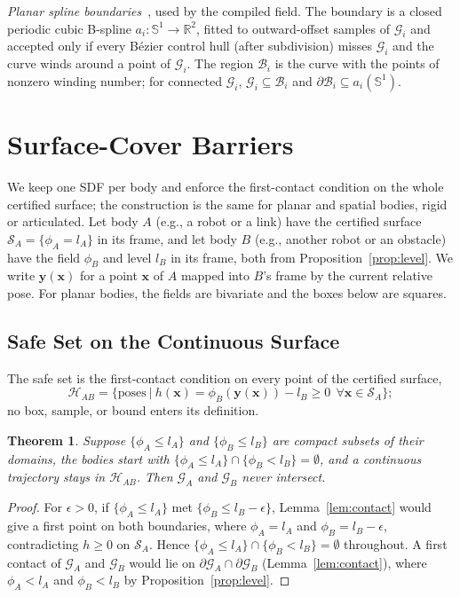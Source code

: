 \documentclass[journal]{IEEEtran}
\newtheorem{theorem}{Theorem}
\theoremstyle{definition}
\newcommand{\R}{\mathbb{R}}
\newcommand{\Sone}{\mathbb{S}^1}
\begin{document}
\emph{Planar spline boundaries}~\cite{jo2027semantic}, used by the compiled field. The boundary is a closed periodic cubic
B-spline $a_i:\Sone\to\R^2$, fitted to outward-offset samples of $\mathcal G_i$ and accepted only if
every B\'ezier control hull (after subdivision) misses $\mathcal G_i$ and the curve winds around a
point of $\mathcal G_i$. The region $\mathcal B_i$ is the curve with the points of nonzero winding
number; for connected $\mathcal G_i$, $\mathcal G_i\subseteq\mathcal B_i$ and
$\partial\mathcal B_i\subseteq a_i(\Sone)$.

\section{Surface-Cover Barriers}\label{sec:cover}
We keep one SDF per body and enforce the first-contact condition on the whole certified surface; the
construction is the same for planar and spatial bodies, rigid or articulated. Let body $A$ (e.g., a
robot or a link) have the certified surface $\mathcal S_A=\{\phi_A=l_A\}$ in its frame, and let body $B$
(e.g., another robot or an obstacle) have the field $\phi_B$ and level $l_B$ in its frame, both from
Proposition~\ref{prop:level}. We write $\mathbf y(\mathbf x)$ for a point $\mathbf x$ of $A$ mapped into
$B$'s frame by the current relative pose. For planar bodies, the fields are bivariate and the boxes
below are squares.

\subsection{Safe Set on the Continuous Surface}
The safe set is the first-contact condition on every point of the certified surface,
\begin{equation}\label{eq:safe}
\mathcal H_{AB}=\big\{\text{poses}\ \big|\ h(\mathbf x)=\phi_B(\mathbf y(\mathbf x))-l_B\ge0\ \ \forall\mathbf x\in\mathcal S_A\big\};
\end{equation}
no box, sample, or bound enters its definition.
\begin{theorem}\label{thm:cover}
Suppose $\{\phi_A\le l_A\}$ and $\{\phi_B\le l_B\}$ are compact subsets of their domains, the bodies
start with $\{\phi_A\le l_A\}\cap\{\phi_B<l_B\}=\emptyset$, and a continuous trajectory stays in
$\mathcal H_{AB}$. Then $\mathcal G_A$ and $\mathcal G_B$ never intersect.
\end{theorem}
\begin{proof}
For $\epsilon>0$, if $\{\phi_A\le l_A\}$ met $\{\phi_B\le l_B-\epsilon\}$, Lemma~\ref{lem:contact} would
give a first point on both boundaries, where $\phi_A=l_A$ and $\phi_B=l_B-\epsilon$, contradicting
$h\ge0$ on $\mathcal S_A$. Hence $\{\phi_A\le l_A\}\cap\{\phi_B<l_B\}=\emptyset$ throughout. A first
contact of $\mathcal G_A$ and $\mathcal G_B$ would lie on $\partial\mathcal G_A\cap\partial\mathcal G_B$
(Lemma~\ref{lem:contact}), where $\phi_A<l_A$ and $\phi_B<l_B$ by Proposition~\ref{prop:level}.
\end{proof}
\end{document}
